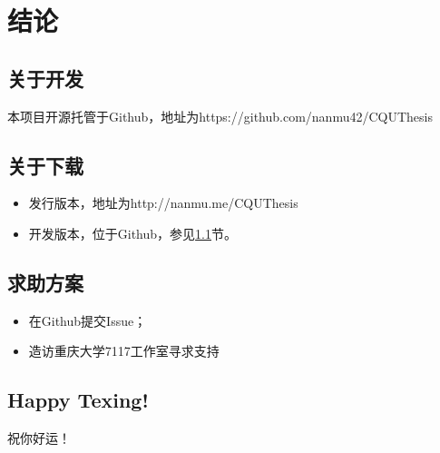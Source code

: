 \chapter{结论}
\section{关于开发}\label{sec:dev}
本项目开源托管于Github，地址为https://github.com/nanmu42/CQUThesis
\section{关于下载}
\begin{itemize}
	\item 发行版本，地址为http://nanmu.me/CQUThesis
	\item 开发版本，位于Github，参见\ref{sec:dev}节。
\end{itemize}
\section{求助方案}
\begin{itemize}
	\item 在Github提交Issue；
	\item 造访重庆大学7117工作室寻求支持
\end{itemize}
\section{Happy Texing!}
祝你好运！